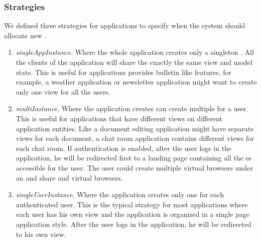 

\subsubsection{\appins{} Strategies}
We defined three strategies for applications to specify when the system should 
allocate new \appins{}.

\begin{enumerate}
\item \emph{singleAppInstance}. Where the whole application creates only a singleton \appins{}.
All the clients of the application will share the exactly the same view and model state. This is useful
for applications provides bulletin like features, for example, a weather application or newsletter 
application might want to create only one view for all the users.

\item \emph{multiInstance}. Where the application creates can create multiple \appins{} for a user.
This is useful for applications that have different views on different application entities.
Like a document editing application might have separate views for each document, a chat room application 
contains different views for each chat room.
If authentication is enabled, 
after the user logs in the application, he will be redirected first to a landing page 
containing all the \appins{}es accessible for the user.
The user could create multiple virtual browsers under an \appins{} and share
\appins{} and virtual browsers.


\item \emph{singleUserInstance}. Where the application creates only one \appins{} for each authenticated user.
This is the typical strategy for most applications where each user has his own view and the application
is organized in a single page application style. 
After the user logs in the application, he will be redirected to his own view.
\end{enumerate}


